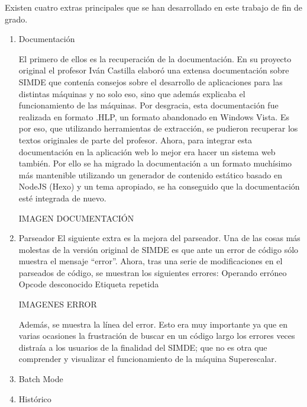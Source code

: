 

Existen cuatro extras principales que se han desarrollado en este trabajo de fin de grado. 

\begin{enumerate}
\item  Documentación

El primero de ellos es la recuperación de la documentación. En su proyecto original el profesor Iván Castilla elaboró una extensa documentación sobre SIMDE que contenía consejos sobre el desarrollo de aplicaciones para las distintas máquinas y no solo eso, sino que además explicaba el funcionamiento de las máquinas.
    Por desgracia, esta documentación fue realizada en formato .HLP, un formato abandonado en Windows Vista. Es por eso, que utilizando herramientas de extracción, se pudieron recuperar los textos originales de parte del profesor.
    Ahora, para integrar esta documentación en la aplicación web lo mejor era hacer un sistema web también. Por ello se ha migrado la documentación a un formato muchísimo más mantenible utilizando un generador de contenido estático basado en NodeJS (Hexo) y un tema apropiado, se ha conseguido que la documentación esté integrada de nuevo.

    IMAGEN DOCUMENTACIÓN

\item  Parseador
    El siguiente extra es la mejora del parseador. Una de las cosas más molestas de la versión original de SIMDE es que ante un error de código sólo muestra el mensaje “error”. 
    Ahora, tras una serie de modificaciones en el parseados de código, se muestran los siguientes errores:
Operando erróneo
Opcode desconocido
Etiqueta repetida

IMAGENES ERROR

    Además, se muestra la línea del error. Esto era muy importante ya que en varias ocasiones la frustración de buscar en un código largo los errores   veces distraía a los usuarios de la finalidad del SIMDE; que no es otra que comprender y visualizar el funcionamiento de la máquina Superescalar.

\item Batch Mode

\item Histórico
\end{enumerate}

